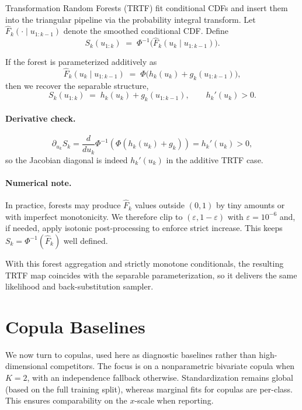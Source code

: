 \documentclass[11pt,a4paper,twoside]{book}\usepackage[]{graphicx}\usepackage[]{xcolor}
\begin{document}
Transformation Random Forests (TRTF) fit conditional CDFs and insert them into the triangular pipeline via the probability integral transform. Let $\widehat F_k(\cdot \mid u_{1:k-1})$ denote the smoothed conditional CDF. Define
\begin{equation}
  S_k(u_{1:k}) \;=\; \Phi^{-1}\!\Big(\widehat F_k(u_k \mid u_{1:k-1})\Big).
  \label{eq:transport-trtf-map}
\end{equation}

If the forest is parameterized additively as
\begin{equation}
  \widehat F_k(u_k \mid u_{1:k-1}) \;=\; \Phi\!\big(h_k(u_k) + g_k(u_{1:k-1})\big),
  \label{eq:transport-trtf-additive}
\end{equation}
then we recover the separable structure,
\begin{equation}
  S_k(u_{1:k}) \;=\; h_k(u_k) + g_k(u_{1:k-1}), \qquad h_k'(u_k) > 0.
  \label{eq:transport-trtf-separable}
\end{equation}

\paragraph{Derivative check.}
\[
\partial_{u_k}S_k
= \frac{d}{du_k}\Phi^{-1}(\Phi(h_k(u_k)+g_k))
= h_k'(u_k) > 0,
\]
so the Jacobian diagonal is indeed $h_k'(u_k)$ in the additive TRTF case.

\paragraph{Numerical note.}
In practice, forests may produce $\widehat F_k$ values outside $(0,1)$ by tiny amounts or with imperfect monotonicity. We therefore clip to $(\varepsilon,1-\varepsilon)$ with $\varepsilon=10^{-6}$ and, if needed, apply isotonic post-processing to enforce strict increase. This keeps $S_k=\Phi^{-1}(\widehat F_k)$ well defined.

With this forest aggregation and strictly monotone conditionals, the resulting TRTF map coincides with the separable parameterization, so it delivers the same likelihood and back-substitution sampler.

\section{Copula Baselines}\label{sec:transport-copula}

We now turn to copulas, used here as diagnostic baselines rather than high-dimensional competitors. The focus is on a nonparametric bivariate copula when $K=2$, with an independence fallback otherwise. Standardization remains global (based on the full training split), whereas marginal fits for copulas are per-class. This ensures comparability on the $x$-scale when reporting.
\end{document}
